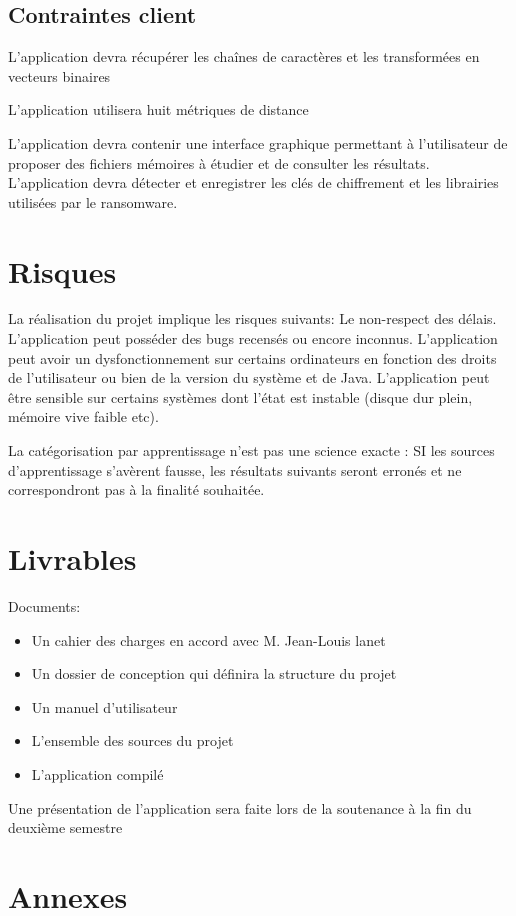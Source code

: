 \documentclass[a4paper, 12pt, twoside]{article}
\begin{document}
\subsection{Contraintes client}
L’application devra récupérer les chaînes de caractères et les transformées en vecteurs binaires

L’application utilisera huit métriques de distance 

L’application devra contenir une interface graphique permettant à l’utilisateur de proposer des fichiers mémoires à étudier et de consulter les résultats.
L’application devra détecter et enregistrer les clés de chiffrement et les librairies utilisées par le ransomware.

\section{Risques}
La réalisation du projet implique les risques suivants:
Le non-respect des délais.
L’application peut posséder des bugs recensés ou encore inconnus.
L’application peut avoir un dysfonctionnement sur certains ordinateurs en fonction des droits de l’utilisateur ou bien de la version du système et de Java.
L’application peut être sensible sur certains systèmes dont l’état est instable (disque dur plein, mémoire vive faible etc).

La catégorisation par apprentissage n’est pas une science exacte : SI les sources d’apprentissage s’avèrent fausse, les résultats suivants seront erronés et ne correspondront pas à la finalité souhaitée.

\section{Livrables}
Documents:
\begin{itemize}
\item Un cahier des charges en accord avec M. Jean-Louis lanet
\item Un dossier de conception qui définira la structure du projet
\item Un manuel d’utilisateur
\item L’ensemble des sources du projet
\item L’application compilé
\end{itemize}
Une présentation de l’application sera faite lors de la soutenance à la fin du deuxième semestre

\section{Annexes}
\end{document}
